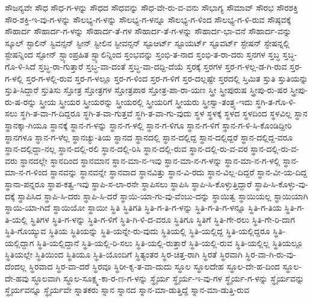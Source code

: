 {ಸೌಜನ್ಯವೇ
ಸೌಧ
ಸೌಧ-ಗ-ಳನ್ನು
ಸೌಧದ
ಸೌಧವನ್ನು
ಸೌಧ-ವೇ-ರು-ವ-ವನು
ಸೌಭಾಗ್ಯ
ಸೌಮಾವ್
ಸೌರಭ
ಸೌರಶಕ್ತಿ
ಸೌರ-ಶಕ್ತಿ-ಇ-ವು-ಗ-ಳನ್ನು
ಸೌಲಭ್ಯ-ಗ-ಳನ್ನು
ಸೌಲಭ್ಯ-ಗ-ಳನ್ನೂ
ಸೌಲಭ್ಯ-ಗ-ಳಿಂದ
ಸೌಲಭ್ಯ-ಗ-ಳಿ-ರುವ
ಸೌಷ್ಠವಕ್ಕೆ
ಸೌಹಾರ್ದ
ಸೌಹಾರ್ದ-ಗ-ಳನ್ನು
ಸೌಹಾರ್ದ-ತೆ-ಗಳ
ಸೌಹಾರ್ದ-ತೆ-ಗ-ಳನ್ನು
ಸೌಹಾರ್ದ-ಭಾ-ವನೆ
ಸೌಹಾರ್ದ-ವನ್ನು
ಸ್ಕೂಲ್
ಸ್ಟಾಲಿನ್
ಸ್ಟಿವನ್ಸನ್
ಸ್ಟೀನ್
ಸ್ಟೀಲಿನ
ಸ್ಟೀವನ್ಸನ್
ಸ್ಟೂಆರ್ಟ್
ಸ್ಟೂಯರ್ಟ್
ಸ್ಟೂವರ್ಟ್
ಸ್ಟೇಷನ್
ಸ್ಟೇಷನ್ನಲ್ಲಿ
ಸ್ಟೇಷನ್ನಿಂದ
ಸ್ಟೋನ್
ಸ್ಟ್ಯಾಂಪ್ರಹಿತ
ಸ್ಟ್ಯಾಲಿನ್ನಿಂದ
ಸ್ತಂಭವನ್ನು
ಸ್ತಂಭಿ-ತ-ನಾದ
ಸ್ತಂಭಿ-ತ-ರಾ-ದರು
ಸ್ತನಗಳ
ಸ್ತಬ್ಧ
ಸ್ತಬ್ಧ-ಗೊ-ಳಿ-ಸಿದೆ
ಸ್ತಬ್ಧ-ರಾ-ಗುತ್ತಾರೆ
ಸ್ತಬ್ಧ-ವಾ-ದಂತೆ
ಸ್ತಬ್ಧ-ವಾ-ದದ್ದಿ-ದೆಯೆ
ಸ್ತರಕ್ಕೆ
ಸ್ತರಗಳ
ಸ್ತರ-ಗ-ಳಲ್ಲ-ಡ-ಗಿ-ರುವ
ಸ್ತರ-ಗ-ಳಲ್ಲಿ
ಸ್ತರ-ಗ-ಳಲ್ಲಿ-ರುವ
ಸ್ತರ-ಗ-ಳಲ್ಲೂ
ಸ್ತರ-ಗ-ಳಿಂದ
ಸ್ತರ-ಗ-ಳಿಗೆ
ಸ್ತರ-ದಲ್ಲಷ್ಟೇ
ಸ್ತರದಲ್ಲಿ
ಸ್ತಿಮಿತ
ಸ್ತುತಿ
ಸ್ತುತಿಯನ್ನು
ಸ್ತುತಿ-ಸಿದ್ದಾರೆ
ಸ್ತುತಿಸು
ಸ್ತೋತ್ರ
ಸ್ತೋತ್ರಗಳ
ಸ್ತೋತ್ರಪಾಠ
ಸ್ತೋತ್ರ-ಪಾ-ರಾ-ಯಣ
ಸ್ತ್ರೀ
ಸ್ತ್ರೀಪುರುಷ
ಸ್ತ್ರೀಪು-ರು-ಷರ
ಸ್ತ್ರೀಪು-ರು-ಷ-ರನ್ನು
ಸ್ತ್ರೀಯ
ಸ್ತ್ರೀಯರ
ಸ್ತ್ರೀಯರನ್ನು
ಸ್ತ್ರೀಯರಲ್ಲಿ
ಸ್ತ್ರೀಯರಿಗೆ
ಸ್ತ್ರೀಯರು
ಸ್ತ್ರೀಸ್ವಾ-ತಂತ್ರ್ಯ-ಇದು
ಸ್ಥಗಿ-ತ-ಗೊ-ಳಿ-ಸಲು
ಸ್ಥಗಿ-ತ-ವಾ-ಗ-ದಿದ್ದರೂ
ಸ್ಥಗಿ-ತ-ವಾ-ಗುತ್ತವೆ
ಸ್ಥಗಿ-ತ-ವಾ-ಗು-ವುದು
ಸ್ಥಳ
ಸ್ಥಳಕ್ಕೆ
ಸ್ಥಳದ
ಸ್ಥಳದಿಂದ
ಸ್ಥಳವಿಲ್ಲ
ಸ್ಥಾನ
ಸ್ಥಾನಕ್ಕಾ-ಗಿಯೂ
ಸ್ಥಾನಕ್ಕೆ
ಸ್ಥಾನ-ಗ-ಳನ್ನು
ಸ್ಥಾನ-ಗ-ಳಲ್ಲಿ
ಸ್ಥಾನ-ಗ-ಳಿಗೂ
ಸ್ಥಾನ-ಗ-ಳಿಗೆ
ಸ್ಥಾನ-ಗ-ಳಿ-ಸಿ-ಕೊಂಡಿದ್ದೀರಿ
ಸ್ಥಾನಗಳೂ
ಸ್ಥಾನ-ಗ-ಳೆಲ್ಲ
ಸ್ಥಾನಚ್ಯು-ತಿಯ
ಸ್ಥಾನದ
ಸ್ಥಾನದಲ್ಲಿ
ಸ್ಥಾನ-ದಲ್ಲಿದ್ದ
ಸ್ಥಾನ-ದಲ್ಲಿದ್ದರೆ
ಸ್ಥಾನ-ದಲ್ಲಿದ್ದ-ವರೂ
ಸ್ಥಾನ-ದಲ್ಲಿದ್ದಾ-ನಲ್ಲ
ಸ್ಥಾನ-ದಲ್ಲಿ-ರಲಿ
ಸ್ಥಾನ-ದಲ್ಲಿ-ರಿಸಿ
ಸ್ಥಾನ-ದಲ್ಲಿ-ರುವ
ಸ್ಥಾನ-ದಲ್ಲಿ-ರು-ವ-ವರ
ಸ್ಥಾನ-ದಲ್ಲಿ-ರು-ವ-ವರು
ಸ್ಥಾನದಲ್ಲೇ
ಸ್ಥಾನದಿಂದ
ಸ್ಥಾನಮಾನ
ಸ್ಥಾನ-ಮಾ-ನ-ಇವು
ಸ್ಥಾನ-ಮಾ-ನ-ಗ-ಳನ್ನು
ಸ್ಥಾನ-ಮಾ-ನ-ಗ-ಳಲ್ಲಿ
ಸ್ಥಾನ-ಮಾ-ನ-ಗ-ಳಿಂದ
ಸ್ಥಾನವನ್ನು
ಸ್ಥಾನವನ್ನೇ
ಸ್ಥಾನವಾದ
ಸ್ಥಾನವಿತ್ತು
ಸ್ಥಾನ-ವಿ-ರದು
ಸ್ಥಾನ-ವಿಲ್ಲ-ದಿದ್ದರೆ
ಸ್ಥಾನ-ವೀ-ಯ-ದಿದ್ದ
ಸ್ಥಾನಾ-ಪನ್ನರೂ
ಸ್ಥಾಪ-ಕತ್ವ-ಇವು
ಸ್ಥಾಪಿ-ಸ-ಲಾ-ರನೇ
ಸ್ಥಾಪಿಸಲು
ಸ್ಥಾಪಿಸಿ
ಸ್ಥಾಪಿ-ಸಿ-ಕೊಳ್ಳುತ್ತಿದ್ದಾರೆ
ಸ್ಥಾಪಿ-ಸಿ-ಕೊಳ್ಳು-ವು-ದಕ್ಕೆ
ಸ್ಥಾಪಿಸಿದ
ಸ್ಥಾಪಿ-ಸಿ-ದರು
ಸ್ಥಾಪಿ-ಸಿ-ದರೆ
ಸ್ಥಾಯಿ-ಯಾ-ಗು-ವು-ವೆಂಬು-ದನ್ನು
ಸ್ಥಾಯಿತ್ವ
ಸ್ಥಾಯಿಯಲ್ಲ
ಸ್ಥಾಯಿಯಾಗಿ
ಸ್ಥಾಯಿ-ಯಾ-ಗಿದೆ
ಸ್ಥಾಯಿಯೋ
ಸ್ಥಾಯೀ
ಸ್ಥಿತಿ
ಸ್ಥಿತಿಗತಿ
ಸ್ಥಿತಿ-ಗ-ತಿ-ಗ-ಳನ್ನು
ಸ್ಥಿತಿ-ಗ-ತಿ-ಗ-ಳನ್ನೂ
ಸ್ಥಿತಿ-ಗ-ತಿಯ
ಸ್ಥಿತಿ-ಗ-ತಿ-ಯಲ್ಲಿ
ಸ್ಥಿತಿಗಳ
ಸ್ಥಿತಿ-ಗ-ಳನ್ನು
ಸ್ಥಿತಿ-ಗ-ಳಿಗೆ
ಸ್ಥಿತಿ-ಗಿ-ಳಿ-ದ-ವರೂ
ಸ್ಥಿತಿಗೂ
ಸ್ಥಿತಿಗೆ
ಸ್ಥಿತಿ-ಗೇ-ರಲು
ಸ್ಥಿತಿ-ಗೇ-ರಿ-ದಾಗ
ಸ್ಥಿತಿ-ಗೊಯ್ಯುವ
ಸ್ಥಿತಿಯ
ಸ್ಥಿತಿಯನ್ನು
ಸ್ಥಿತಿ-ಯನ್ನೇ-ರು-ವುದು
ಸ್ಥಿತಿಯಲ್ಲಿ
ಸ್ಥಿತಿ-ಯಲ್ಲಿದ್ದ
ಸ್ಥಿತಿ-ಯಲ್ಲಿದ್ದರೂ
ಸ್ಥಿತಿ-ಯಲ್ಲಿದ್ದಾಗ
ಸ್ಥಿತಿ-ಯಲ್ಲಿದ್ದಾನೆ
ಸ್ಥಿತಿ-ಯಲ್ಲಿ-ರಿ-ಸಲು
ಸ್ಥಿತಿ-ಯಲ್ಲಿ-ರುತ್ತಾರೆ
ಸ್ಥಿತಿ-ಯಲ್ಲಿ-ರುವ
ಸ್ಥಿತಿ-ಯಲ್ಲಿಲ್ಲ
ಸ್ಥಿತಿಯಲ್ಲೂ
ಸ್ಥಿತಿಯಲ್ಲೇ
ಸ್ಥಿತಿಯಿಂದ
ಸ್ಥಿತಿಯೂ
ಸ್ಥಿತಿ-ಯೊಂದಿಗೆ
ಸ್ಥಿತ್ಯಂತರ
ಸ್ಥಿರ-ಚಿತ್ತ-ರಾಗಿ
ಸ್ಥಿರತೆ
ಸ್ಥಿರವಾಗಿ
ಸ್ಥಿರ-ವಾ-ಗಿ-ರು-ವು-ದೆಂದಲ್ಲ
ಸ್ಥಿರವಾದ
ಸ್ಥಿರ-ವಾ-ದರೆ
ಸ್ಥಿರವೂ
ಸ್ಥಿರೀ-ಕೃ-ತ-ವಾ-ದುದು
ಸ್ಥೂಲ
ಸ್ಥೂಲದೇಹ
ಸ್ಥೂಲ-ದೇ-ಹ-ದಿಂದ
ಸ್ಥೂಲ-ದೇ-ಹವು
ಸ್ಥೂಲವಾಗಿ
ಸ್ಥೂಲ-ಸೂಕ್ಷ್ಮ-ಕಾ-ರ-ಣ-ಗ-ಳನ್ನು
ಸ್ಥೈರ್ಯ
ಸ್ಥೈರ್ಯ-ಇ-ವು-ಗಳ
ಸ್ಥೈರ್ಯ-ಗ-ಳನ್ನು
ಸ್ಥೈರ್ಯವನ್ನು
ಸ್ಥೈರ್ಯವನ್ನೂ
ಸ್ಥೈರ್ಯವೇ
ಸ್ನಾತಕರು
ಸ್ನಾನ
ಸ್ನಾನದ
ಸ್ನಾನ-ಮಾ-ಡುತ್ತಿದ್ದೆ
ಸ್ನಾನ-ಮಾ-ಡುತ್ತಿ-ರುವ
}
